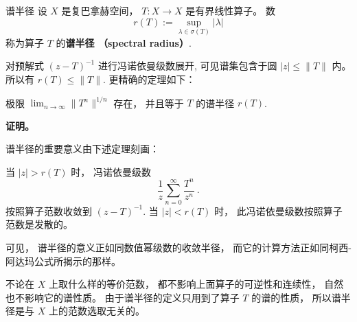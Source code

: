 
\begin{definition}{谱半径}
设 $X$ 是复巴拿赫空间， $T:X\to X$ 是有界线性算子。 数
$$
r(T):=\sup_{\lambda\in\sigma(T)}|\lambda|
$$
称为算子 $T$ 的\textbf{谱半径 （spectral radius）}.
\end{definition}

对预解式 $(z-T)^{-1}$ 进行冯诺依曼级数展开, 可见谱集包含于圆 $|z|\leq\|T\|$ 内。 所以有 $r(T)\leq\|T\|$. 更精确的定理如下：
\begin{theorem}{}
极限 $\lim_{n\to\infty}\|T^n\|^{1/n}$ 存在， 并且等于 $T$ 的谱半径 $r(T)$. 
\end{theorem}
\textbf{证明。} 

谱半径的重要意义由下述定理刻画：
\begin{theorem}{}
当 $|z|>r(T)$ 时， 冯诺依曼级数
$$
\frac{1}{z}\sum_{n=0}^\infty\frac{T^n}{z^n}~.
$$ 
按照算子范数收敛到 $(z-T)^{-1}$. 当 $|z|<r(T)$ 时， 此冯诺依曼级数按照算子范数是发散的。
\end{theorem}

可见， 谱半径的意义正如同数值幂级数的收敛半径， 而它的计算方法正如同柯西-阿达玛公式所揭示的那样。

不论在 $X$ 上取什么样的等价范数， 都不影响上面算子的可逆性和连续性， 自然也不影响它的谱性质。 由于谱半径的定义只用到了算子 $T$ 的谱的性质， 所以谱半径是与 $X$ 上的范数选取无关的。 